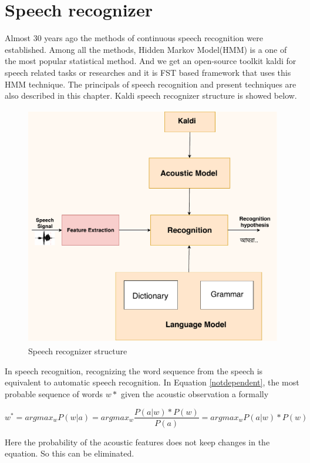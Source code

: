 \documentclass{standalone}
\begin{document}
\section{Speech recognizer}
Almost 30 years ago the methods of continuous speech recognition were established. Among all the methods, Hidden Markov Model(HMM) is a one of the most popular statistical method. And we get an open-source toolkit kaldi \cite{povey2011kaldi} for speech related tasks or researches and it is FST based framework that uses this HMM technique. The principals of speech recognition and present techniques are also described in this chapter. Kaldi speech recognizer structure is showed below.
\\
\begin{figure}[h]
 \centering
 \centerline{\includegraphics[width=13cm, height=10.5cm]{img/SR_structure.pdf}}
 \caption{Speech recognizer structure}
\label{fig:student}
\end{figure}

In speech recognition, recognizing the word sequence from the speech is equivalent to automatic speech recognition. In Equation \ref{notdependent}, the most probable sequence of words $w*$ given the acoustic observation \cite{lee1988automatic} a formally

    \begin{equation}\label{notdependent}
        w^*=argmax_w{P(w|a)}=argmax_w{\frac{P(a|w)*P(w)}{P(a)}}=argmax_w{P(a|w)*P(w)}
    \end{equation}
    
Here the probability of the acoustic features does not keep changes in the equation. So this can be eliminated.
\end{document}
